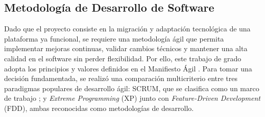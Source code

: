 \subsection{Metodología de Desarrollo de Software}

Dado que el proyecto consiste en la migración y adaptación tecnológica de una plataforma ya funcional, se requiere una metodología ágil que permita implementar mejoras continuas, validar cambios técnicos y mantener una alta calidad en el software sin perder flexibilidad. Por ello, este trabajo de grado adopta los principios y valores definidos en el Manifiesto Ágil \cite{AgileManifesto2001}. Para tomar una decisión fundamentada, se realizó una comparación multicriterio entre tres paradigmas populares de desarrollo ágil: SCRUM, que se clasifica como un marco de trabajo \cite{ScrumGuide2020}; y \textit{Extreme Programming} (XP) junto con \textit{Feature-Driven Development} (FDD), ambas reconocidas como metodologías de desarrollo.

\newcommand{\comparativaMetodologiasHeader}{
  \grayTableHeaderCell{3cm}{Criterio} &
  \grayTableHeaderCell{3cm}{SCRUM} &
  \grayTableHeaderCell{3cm}{XP} &
  \grayTableHeaderCell{3cm}{FDD} \\
}

\newcommand\metodologiasTableCaption{Comparativa entre las metodologías de desarrollo de software de interés. \hspace{1em}}

